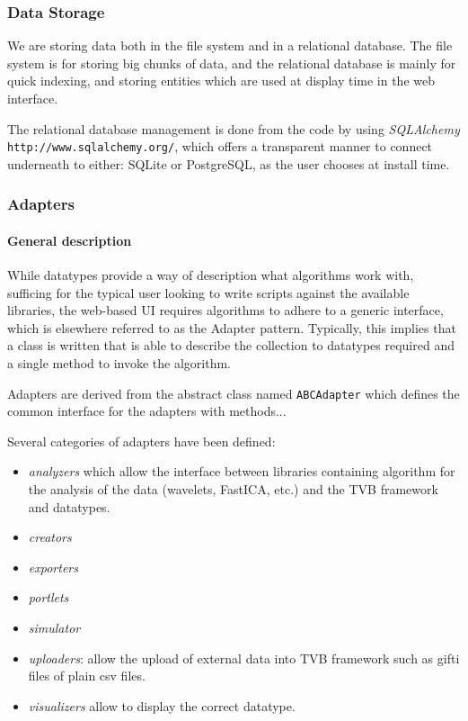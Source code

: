 \subsubsection{Data Storage}

We are storing data both in the file system and in a relational database.
The file system is for storing big chunks of data, and the relational database is mainly for quick indexing, 
and storing entities which are used at display time in the web interface.

The relational database management is done from the code by using \emph{SQLAlchemy} \texttt{http://www.sqlalchemy.org/}, 
which offers a transparent manner to connect underneath to either: SQLite or PostgreSQL, as the user chooses at install time.


\subsubsection{Adapters}

\paragraph{General description}

While datatypes provide a way of description what algorithms work with, 
sufficing for the typical user looking to write scripts against the
available libraries, the web-based UI requires algorithms to adhere to 
a generic interface, which is elsewhere referred to as the Adapter pattern.
Typically, this implies that a class is written that is able to describe
the collection to datatypes required and a single method to invoke the
algorithm.

Adapters are derived from the abstract class named \texttt{ABCAdapter} which
defines the common interface for the adapters with methods...

Several categories of adapters have been defined: 
\begin{itemize}
    \item \textit{analyzers} which allow the interface between libraries
        containing algorithm for the analysis of the data (wavelets, FastICA,
        etc.) and the TVB framework and datatypes.
    \item \textit{creators}
    \item \textit{exporters} 
    \item \textit{portlets} 
    \item \textit{simulator}
\item \textit{uploaders}: allow the upload of external data into TVB framework
    such as gifti files of plain csv files.
\item \textit{visualizers}  allow
    to display the correct datatype.
\end{itemize}


